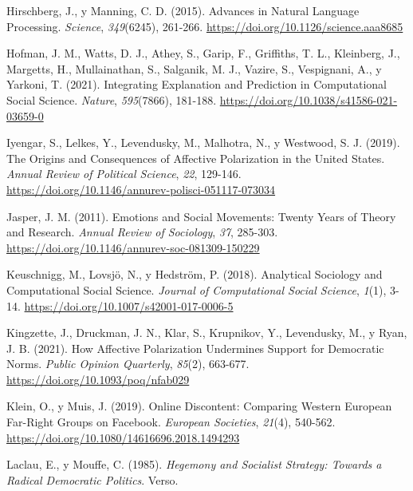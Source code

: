 \documentclass[
  letterpaper,
  numbers=noendperiod,
  fontsize=11pt,
  DIV=12,
  titlepage=false]{scrreprt}
\newlength{\cslhangindent}
\newenvironment{CSLReferences}[2] %
 {\begin{list}{}{%
  \setlength{\itemindent}{0pt}
  \setlength{\leftmargin}{0pt}
  \setlength{\parsep}{0pt}
  \ifodd #1
   \setlength{\leftmargin}{\cslhangindent}
   \setlength{\itemindent}{-1\cslhangindent}
  \fi
  \setlength{\itemsep}{#2\baselineskip}}}
 {\end{list}}
\begin{document}
\begin{CSLReferences}{1}{0}
Hirschberg, J., y Manning, C. D. (2015). Advances in Natural Language
Processing. \emph{Science}, \emph{349}(6245), 261-266.
\url{https://doi.org/10.1126/science.aaa8685}

Hofman, J. M., Watts, D. J., Athey, S., Garip, F., Griffiths, T. L.,
Kleinberg, J., Margetts, H., Mullainathan, S., Salganik, M. J., Vazire,
S., Vespignani, A., y Yarkoni, T. (2021). Integrating Explanation and
Prediction in Computational Social Science. \emph{Nature},
\emph{595}(7866), 181-188.
\url{https://doi.org/10.1038/s41586-021-03659-0}

Iyengar, S., Lelkes, Y., Levendusky, M., Malhotra, N., y Westwood, S. J.
(2019). The Origins and Consequences of Affective Polarization in the
{United States}. \emph{Annual Review of Political Science}, \emph{22},
129-146. \url{https://doi.org/10.1146/annurev-polisci-051117-073034}

Jasper, J. M. (2011). Emotions and Social Movements: Twenty Years of
Theory and Research. \emph{Annual Review of Sociology}, \emph{37},
285-303. \url{https://doi.org/10.1146/annurev-soc-081309-150229}

Keuschnigg, M., Lovsjö, N., y Hedström, P. (2018). Analytical Sociology
and Computational Social Science. \emph{Journal of Computational Social
Science}, \emph{1}(1), 3-14.
\url{https://doi.org/10.1007/s42001-017-0006-5}

Kingzette, J., Druckman, J. N., Klar, S., Krupnikov, Y., Levendusky, M.,
y Ryan, J. B. (2021). How {Affective Polarization Undermines Support}
for {Democratic Norms}. \emph{Public Opinion Quarterly}, \emph{85}(2),
663-677. \url{https://doi.org/10.1093/poq/nfab029}

Klein, O., y Muis, J. (2019). Online Discontent: Comparing {Western
European} Far-Right Groups on {Facebook}. \emph{European Societies},
\emph{21}(4), 540-562.
\url{https://doi.org/10.1080/14616696.2018.1494293}

Laclau, E., y Mouffe, C. (1985). \emph{Hegemony and Socialist Strategy:
Towards a Radical Democratic Politics}. Verso.


\end{CSLReferences}
\end{document}
